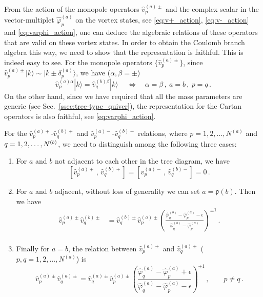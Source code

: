 \documentclass[12pt,a4paper]{article}
\newcounter{subsubsubsection}[subsubsection]
\renewcommand{\(}{\left(}
\renewcommand{\)}{\right)}
\newcommand{\eps}{\epsilon}
\renewcommand{\(}{\left(}
\renewcommand{\)}{\right)}
\begin{document}
From the action of the monopole operators $\hat{v}^{(a)\pm}_p$ and the complex scalar in the vector-multiplet $\hat{\varphi}^{(a)}_p$ on the vortex states, see \eqref{eq:v+_action}, \eqref{eq:v-_action} and \eqref{eq:varphi_action}, one can deduce the algebraic relations of these operators that are valid on these vortex states. 
In order to obtain the Coulomb branch algebra this way, we need to show that the representation is faithful. 
This is indeed easy to see. 
For the monopole operators $\{\hat{v}^{(a)\pm}_p\}$, since $\hat{v}^{(a)\pm}_p|k\rangle\sim |k\pm\delta^{(a)}_p\rangle$, we have ($\alpha,\beta=\pm$)
\begin{equation}
\hat{v}^{(a)\alpha}_p|k\rangle= \hat{v}^{(b)\beta}_q|k\rangle\,\quad \Longleftrightarrow \quad \alpha=\beta\,,\ a=b\,,\ p=q\,.
\end{equation}
On the other hand, since we have required that all the mass parameters are generic (see Sec.~\ref{ssec:tree-type_quiver}), the representation for the Cartan operators is also faithful, see \eqref{eq:varphi_action}.




For the $\hat{v}^{(a)+}_p$-$\hat{v}^{(b)+}_q$ and $\hat{v}^{(a)-}_p$-$\hat{v}^{(b)-}_q$ relations, where $p=1,2,\dots,N^{(a)}$ and $q=1,2,\dots,\\N^{(b)}$, we need to distinguish among the following three cases:
\begin{enumerate}
\item For $a$ and $b$ not adjacent to each other in the tree diagram, we have
\begin{equation}\label{eq:vpmvpm_relation1}
[\hat{v}^{(a)+}_p \,,\, \hat{v}^{(b)+}_q]=[
\hat{v}^{(a)-}_p \,,\,
\hat{v}^{(b)-}_q]=0\,.
\end{equation}
\item For $a$ and $b$ adjacent, without loss of generality we can set $a=\mathfrak{p}(b)$. 
Then we have
\begin{equation} \label{eq:vpmvpm_relation2}
\begin{aligned}
\hat{v}^{(a)\pm}_p \hat{v}^{(b)\pm}_q&=\hat{v}^{(b)\pm}_q\hat{v}^{(a)\pm}_p\left(\frac{\hat{\varphi}^{(b)}_q-\hat{\varphi}^{(a)}_p-\eps}{\hat{\varphi}^{(b)}_q-\hat{\varphi}^{(a)}_p}\right)^{\pm 1}\,.\\ 
\end{aligned}
\end{equation}
\item Finally for $a=b$, the relation between $\hat{v}^{(a)\pm}_p$ and $\hat{v}^{(a)\pm}_q$ ($p,q=1,2,\dots,N^{(a)}$) is
\begin{equation}\label{eq:vpmvpm_relation3}
\hat{v}^{(a)\pm}_p \hat{v}^{(a)\pm}_q=\hat{v}^{(a)\pm}_q\hat{v}^{(a)\pm}_p\left(\frac{\hat{\varphi}^{(a)}_q-\hat{\varphi}^{(a)}_p+\eps}{\hat{\varphi}^{(a)}_q-\hat{\varphi}^{(a)}_p-\eps}\right)^{\pm1}\,,\qquad p\neq q\,.
\end{equation}
\end{enumerate}
\end{document}
